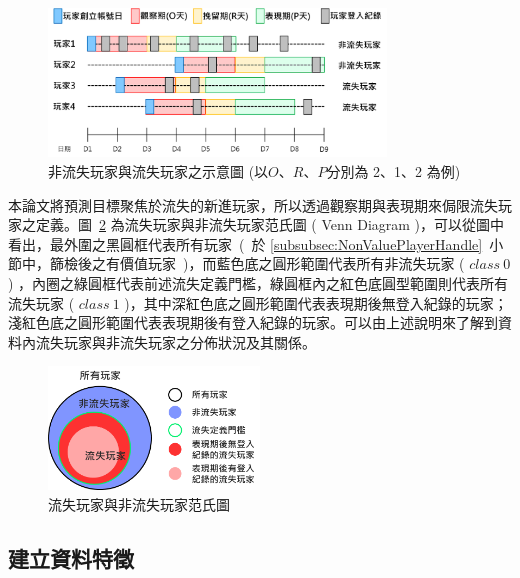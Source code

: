 \begin{figure}[!htb]
  \begin{center}
    \includegraphics[width=0.8\textwidth]{figures/Image_ClassPreparation.png}
    \caption[非流失玩家與流失玩家之示意圖]{非流失玩家與流失玩家之示意圖 (以$O$、$R$、$P$分別為 2、1、2 為例) }
    \label{fig:Image_ClassPreparation}
  \end{center}
\end{figure}

本論文將預測目標聚焦於流失的新進玩家，所以透過觀察期與表現期來侷限流失玩家之定義。圖~\ref{fig:Image_ClassVennChart} 為流失玩家與非流失玩家范氏圖 ( Venn Diagram )，可以從圖中看出，最外圍之黑圓框代表所有玩家\ (\ 於 \ref{subsubsec:NonValuePlayerHandle}~小節中，篩檢後之有價值玩家\ )，而藍色底之圓形範圍代表所有非流失玩家 ( $class\ 0$ ) ，內圈之綠圓框代表前述流失定義門檻，綠圓框內之紅色底圓型範圍則代表所有流失玩家 ( $class\ 1$ )，其中深紅色底之圓形範圍代表表現期後無登入紀錄的玩家；淺紅色底之圓形範圍代表表現期後有登入紀錄的玩家。可以由上述說明來了解到資料內流失玩家與非流失玩家之分佈狀況及其關係。

\begin{figure}[!htb]
  \begin{center}
    \includegraphics[width=0.5\textwidth]{figures/Image_ClassVennChart.png}
    \caption[流失玩家與非流失玩家范氏圖]{流失玩家與非流失玩家范氏圖}
    \label{fig:Image_ClassVennChart}
  \end{center}
\end{figure}

\subsection{建立資料特徵}
\label{subsec:FeatureMining}

